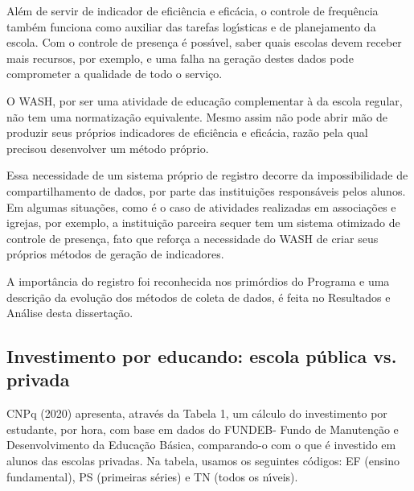 \documentclass[
12pt,		%
openright,	%
twoside,  %
a4paper,			%
chapter=TITLE,		%
english,			%
french,				%
spanish,			%
brazil				%
]{USPSC-classe/USPSC}
\begin{document}
Al\'em de servir de indicador de efici\^encia e efic\'acia, o controle de frequ\^encia tamb\'em funciona como auxiliar das tarefas log\'{\i}sticas e de planejamento da escola. Com o controle de presen\c{c}a \'e poss\'{\i}vel, saber quais escolas devem receber mais recursos, por exemplo, e uma falha na gera\c{c}\~ao destes dados pode comprometer a qualidade de todo o servi\c{c}o.








O WASH, por ser uma atividade de educa\c{c}\~ao complementar \`a da escola regular, n\~ao tem uma normatiza\c{c}\~ao equivalente. Mesmo assim n\~ao pode abrir m\~ao de produzir seus pr\'oprios indicadores de efici\^encia e efic\'acia, raz\~ao pela qual precisou desenvolver um m\'etodo pr\'oprio.








Essa necessidade de um sistema pr\'oprio de registro decorre da impossibilidade de compartilhamento de dados, por parte das institui\c{c}\~oes respons\'aveis pelos alunos. Em algumas situa\c{c}\~oes, como \'e o caso de atividades realizadas em associa\c{c}\~oes e igrejas, por exemplo, a institui\c{c}\~ao parceira sequer tem um sistema otimizado de controle de presen\c{c}a, fato que refor\c{c}a a necessidade do WASH de criar seus pr\'oprios m\'etodos de gera\c{c}\~ao de indicadores.








A import\^ancia do registro foi reconhecida nos prim\'ordios do Programa e uma descri\c{c}\~ao da evolu\c{c}\~ao dos m\'etodos de coleta de dados, \'e feita no Resultados e An\'alise desta disserta\c{c}\~ao.








\subsection[Investimento por educando: escola p\'ublica vs. privada]{Investimento por educando: escola p\'ublica vs. privada}\label{Investimento por educando: escola p\'ublica vs. privada}
CNPq (2020)  apresenta, atrav\'es da Tabela 1, um c\'alculo do investimento por estudante, por hora, com base em dados do FUNDEB- Fundo de Manuten\c{c}\~ao e Desenvolvimento da Educa\c{c}\~ao B\'asica, comparando-o com o que \'e investido em alunos das escolas privadas. Na tabela, usamos os seguintes c\'odigos: EF (ensino fundamental), PS (primeiras s\'eries) e TN (todos os n\'{\i}veis).
\end{document}
